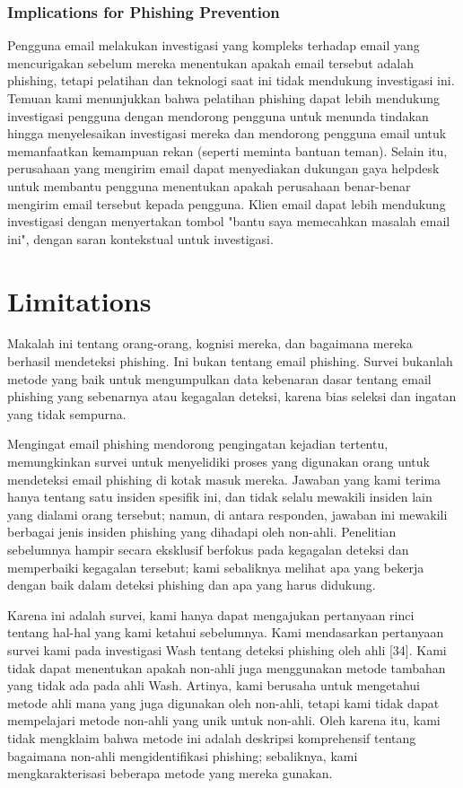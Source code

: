 \documentclass[lettersize,journal]{IEEEtran}
\begin{document}
\subsubsection{Implications for Phishing Prevention}
Pengguna email melakukan investigasi yang kompleks terhadap email yang
mencurigakan sebelum mereka menentukan apakah email tersebut adalah phishing,
tetapi pelatihan dan teknologi saat ini tidak mendukung investigasi ini. Temuan
kami menunjukkan bahwa pelatihan phishing dapat lebih mendukung investigasi
pengguna dengan mendorong pengguna untuk menunda tindakan hingga menyelesaikan
investigasi mereka dan mendorong pengguna email untuk memanfaatkan kemampuan
rekan (seperti meminta bantuan teman). Selain itu, perusahaan yang mengirim
email dapat menyediakan dukungan gaya helpdesk untuk membantu pengguna
menentukan apakah perusahaan benar-benar mengirim email tersebut kepada
pengguna. Klien email dapat lebih mendukung investigasi dengan menyertakan
tombol "bantu saya memecahkan masalah email ini", dengan saran kontekstual
untuk investigasi.

\section{Limitations}
Makalah ini tentang orang-orang, kognisi mereka, dan bagaimana mereka berhasil
mendeteksi phishing. Ini bukan tentang email phishing. Survei bukanlah metode
yang baik untuk mengumpulkan data kebenaran dasar tentang email phishing yang
sebenarnya atau kegagalan deteksi, karena bias seleksi dan ingatan yang tidak
sempurna.

Mengingat email phishing mendorong pengingatan kejadian tertentu, memungkinkan
survei untuk menyelidiki proses yang digunakan orang untuk mendeteksi email
phishing di kotak masuk mereka. Jawaban yang kami terima hanya tentang satu
insiden spesifik ini, dan tidak selalu mewakili insiden lain yang dialami orang
tersebut; namun, di antara responden, jawaban ini mewakili berbagai jenis
insiden phishing yang dihadapi oleh non-ahli. Penelitian sebelumnya hampir
secara eksklusif berfokus pada kegagalan deteksi dan memperbaiki kegagalan
tersebut; kami sebaliknya melihat apa yang bekerja dengan baik dalam deteksi
phishing dan apa yang harus didukung.

Karena ini adalah survei, kami hanya dapat mengajukan pertanyaan rinci tentang
hal-hal yang kami ketahui sebelumnya. Kami mendasarkan pertanyaan survei kami
pada investigasi Wash tentang deteksi phishing oleh ahli [34]. Kami tidak dapat
menentukan apakah non-ahli juga menggunakan metode tambahan yang tidak ada pada
ahli Wash. Artinya, kami berusaha untuk mengetahui metode ahli mana yang juga
digunakan oleh non-ahli, tetapi kami tidak dapat mempelajari metode non-ahli
yang unik untuk non-ahli. Oleh karena itu, kami tidak mengklaim bahwa metode
ini adalah deskripsi komprehensif tentang bagaimana non-ahli mengidentifikasi
phishing; sebaliknya, kami mengkarakterisasi beberapa metode yang mereka
gunakan.
\end{document}
